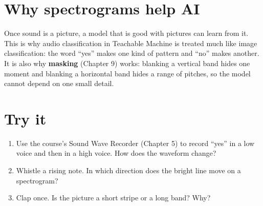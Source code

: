 \section{Why spectrograms help AI}

Once sound is a picture, a model that is good with pictures can learn from it. This is why audio classification in Teachable Machine is treated much like image classification: the word “yes” makes one kind of pattern and “no” makes another. It is also why \textbf{masking} (Chapter 9) works: blanking a vertical band hides one moment and blanking a horizontal band hides a range of pitches, so the model cannot depend on one small detail.


\section{Try it}

\begin{enumerate}
\item Use the course’s Sound Wave Recorder (Chapter 5) to record “yes” in a low voice and then in a high voice. How does the waveform change?
\item Whistle a rising note. In which direction does the bright line move on a spectrogram?
\item Clap once. Is the picture a short stripe or a long band? Why?
\end{enumerate}
